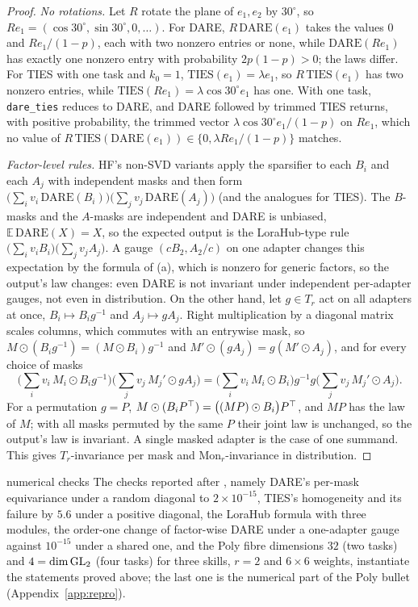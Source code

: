 \begin{proof}
\emph{No rotations.} Let $R$ rotate the plane of $e_1,e_2$ by $30^\circ$, so $Re_1=(\cos30^\circ,\sin30^\circ,0,\dots)$. For DARE,
$R\,\mathrm{DARE}(e_1)$ takes the values $0$ and $Re_1/(1-p)$, each with two nonzero entries or none, while
$\mathrm{DARE}(Re_1)$ has exactly one nonzero entry with probability $2p(1-p)>0$; the laws differ. For TIES with one task and
$k_0=1$, $\mathrm{TIES}(e_1)=\lambda e_1$, so $R\,\mathrm{TIES}(e_1)$ has two nonzero entries, while $\mathrm{TIES}(Re_1)=
\lambda\cos30^\circ e_1$ has one. With one task, \texttt{dare\_ties} reduces to DARE, and DARE followed by trimmed TIES
returns, with positive probability, the trimmed vector $\lambda\cos30^\circ e_1/(1-p)$ on $Re_1$, which no value of
$R\,\mathrm{TIES}(\mathrm{DARE}(e_1))\in\{0,\lambda Re_1/(1-p)\}$ matches.

\emph{Factor-level rules.} HF's non-SVD variants apply the sparsifier to each $B_i$ and each $A_j$ with independent masks and
then form $\big(\sum_iv_i\,\mathrm{DARE}(B_i)\big)\big(\sum_jv_j\,\mathrm{DARE}(A_j)\big)$ (and the analogues for TIES). The
$B$-masks and the $A$-masks are independent and DARE is unbiased, $\mathbb E\,\mathrm{DARE}(X)=X$, so the expected output is the
LoraHub-type rule $\big(\sum_iv_iB_i\big)\big(\sum_jv_jA_j\big)$. A gauge $(cB_2,A_2/c)$ on one adapter changes this expectation
by the formula of (a), which is nonzero for generic factors, so the output's law changes: even DARE is not invariant under
independent per-adapter gauges, not even in distribution. On the other hand, let $g\in T_r$ act on all adapters at once,
$B_i\mapsto B_ig^{-1}$ and $A_j\mapsto gA_j$. Right multiplication by a diagonal matrix scales columns, which commutes with an
entrywise mask, so $M\odot(B_ig^{-1})=(M\odot B_i)g^{-1}$ and $M'\odot(gA_j)=g(M'\odot A_j)$, and for every choice of masks
\[\Big(\sum_iv_i\,M_i\odot B_ig^{-1}\Big)\Big(\sum_jv_j\,M_j'\odot gA_j\Big)=\Big(\sum_iv_i\,M_i\odot B_i\Big)g^{-1}g\Big(\sum_jv_j\,
M_j'\odot A_j\Big).\]
For a permutation $g=P$, $M\odot(B_iP^{\top})=\big((MP)\odot B_i\big)P^{\top}$, and $MP$ has the law of $M$; with all masks permuted by the
same $P$ their joint law is unchanged, so the output's law is invariant. A single masked adapter is the case of one
summand. This gives $T_r$-invariance per mask and $\mathrm{Mon}_r$-invariance in distribution.
\end{proof}

\begin{remark*}{numerical checks}
The checks reported after , namely DARE's per-mask equivariance under a random diagonal to
$2\times10^{-15}$, TIES's homogeneity and its failure by $5.6$ under a positive diagonal, the LoraHub formula with three
modules, the order-one change of factor-wise DARE under a one-adapter gauge against $10^{-15}$ under a shared one, and the Poly
fibre dimensions $32$ (two tasks) and $4=\dim\mathrm{GL}_2$ (four tasks) for three skills, $r=2$ and $6\times6$ weights, instantiate the
statements proved above; the last one is the numerical part of the Poly bullet (Appendix~\ref{app:repro}).
\end{remark*}

